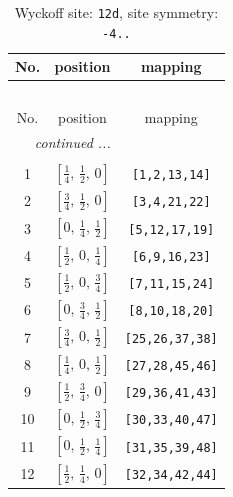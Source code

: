 \documentclass[fleqn,8pt]{jsarticle}
\begin{document}
\begin{longtable}{ccc}
\caption{Wyckoff site: {\tt 12d}, site symmetry: {\tt -4..}}
 \\
 \hline \hline
No. & position & mapping \\ \hline \endfirsthead

\multicolumn{2}{l}{\tablename\ \thetable{}} \\
 \hline \hline
No. & position & mapping \\ \hline \endhead

 \hline \hline
\multicolumn{2}{r}{\footnotesize\it continued ...} \\ \endfoot

 \hline \hline
\multicolumn{2}{r}{} \\ \endlastfoot

1 & $\left[ \frac{1}{4},\, \frac{1}{2},\, 0 \right]$ & {\tt [1,2,13,14]} \\ \hline
2 & $\left[ \frac{3}{4},\, \frac{1}{2},\, 0 \right]$ & {\tt [3,4,21,22]} \\ \hline
3 & $\left[ 0,\, \frac{1}{4},\, \frac{1}{2} \right]$ & {\tt [5,12,17,19]} \\ \hline
4 & $\left[ \frac{1}{2},\, 0,\, \frac{1}{4} \right]$ & {\tt [6,9,16,23]} \\ \hline
5 & $\left[ \frac{1}{2},\, 0,\, \frac{3}{4} \right]$ & {\tt [7,11,15,24]} \\ \hline
6 & $\left[ 0,\, \frac{3}{4},\, \frac{1}{2} \right]$ & {\tt [8,10,18,20]} \\ \hline
7 & $\left[ \frac{3}{4},\, 0,\, \frac{1}{2} \right]$ & {\tt [25,26,37,38]} \\ \hline
8 & $\left[ \frac{1}{4},\, 0,\, \frac{1}{2} \right]$ & {\tt [27,28,45,46]} \\ \hline
9 & $\left[ \frac{1}{2},\, \frac{3}{4},\, 0 \right]$ & {\tt [29,36,41,43]} \\ \hline
10 & $\left[ 0,\, \frac{1}{2},\, \frac{3}{4} \right]$ & {\tt [30,33,40,47]} \\ \hline
11 & $\left[ 0,\, \frac{1}{2},\, \frac{1}{4} \right]$ & {\tt [31,35,39,48]} \\ \hline
12 & $\left[ \frac{1}{2},\, \frac{1}{4},\, 0 \right]$ & {\tt [32,34,42,44]} \\
\end{longtable}
\renewcommand{\arraystretch}{1.2}
\end{document}
